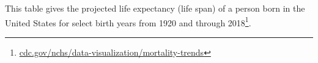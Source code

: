 

\geometry{
    margin=0.67in%
}
\usepackage{fourier}
\usepackage[default]{comicneue}



\usepackage{pagegrid}




This table gives the projected life expectancy (life span)
of a person born in the United States for select birth years
from 1920 and through 2018\footnote{\href{https://www.cdc.gov/nchs/data-visualization/mortality-trends/}{cdc.gov/nchs/data-visualization/mortality-trends}}.

